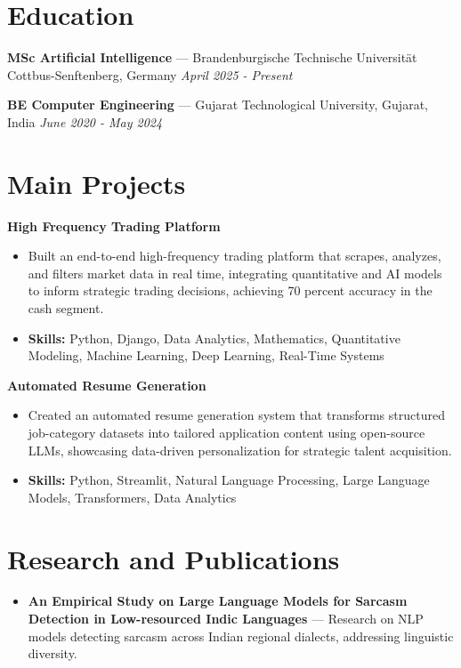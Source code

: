 \documentclass[a4paper,10pt]{article}
\begin{document}
\section*{Education}
\textbf{MSc Artificial Intelligence} — Brandenburgische Technische Universität Cottbus-Senftenberg, Germany \hfill \textit{April 2025 - Present}\par
\vspace{1.5pt}
\textbf{BE Computer Engineering} — Gujarat Technological University, Gujarat, India \hfill \textit{June 2020 - May 2024}\par

\section*{Main Projects}
\textbf{High Frequency Trading Platform}\par
\vspace{1pt}
\begin{itemize}
  \item Built an end-to-end high-frequency trading platform that scrapes, analyzes, and filters market data in real time, integrating quantitative and AI models to inform strategic trading decisions, achieving 70 percent accuracy in the cash segment.
  \item \textbf{Skills:} Python, Django, Data Analytics, Mathematics, Quantitative Modeling, Machine Learning, Deep Learning, Real-Time Systems
\end{itemize}
\vspace{3pt}
\textbf{Automated Resume Generation}\par
\vspace{1pt}
\begin{itemize}
  \item Created an automated resume generation system that transforms structured job-category datasets into tailored application content using open-source LLMs, showcasing data-driven personalization for strategic talent acquisition.
  \item \textbf{Skills:} Python, Streamlit, Natural Language Processing, Large Language Models, Transformers, Data Analytics
\end{itemize}

\section*{Research and Publications}
\begin{itemize}
\item \textbf{An Empirical Study on Large Language Models for Sarcasm Detection in Low-resourced Indic Languages} — Research on NLP models detecting sarcasm across Indian regional dialects, addressing linguistic diversity.
\end{itemize}
\end{document}
